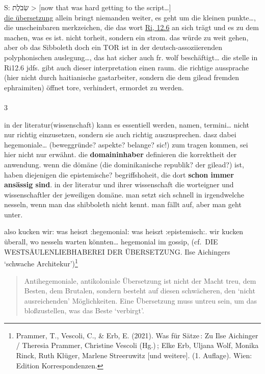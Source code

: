 \documentclass[
  letterpaper,
  DIV=11,
  numbers=noendperiod]{scrartcl}
\makeatletter
\let\oldparagraph\paragraph
\renewcommand{\paragraph}{
    \@ifstar
      \xxxParagraphStar
      \xxxParagraphNoStar
  }
\newcommand{\xxxParagraphStar}[1]{\oldparagraph*{#1}\mbox{}}
\newcommand{\xxxParagraphNoStar}[1]{\oldparagraph{#1}\mbox{}}
\makeatother
\begin{document}
S: שִׂבֹלֶת \textgreater{} {[}now that was hard getting to the
script\ldots{]}\\
\href{https://www.pealim.com/dict/3270-shibolet/}{die übersetzung}
allein bringt niemanden weiter, es geht um die kleinen punkte\ldots, die
unscheinbaren merkzeichen, die das wort
\href{https://www.sefaria.org/Judges.12.6?lang=bi&with=all&lang2=en}{Ri,
12.6} an sich trägt und es zu dem machen, was es ist. nicht torheit,
sondern ein strom. das würde zu weit gehen, aber ob das Sibboleth doch
ein TOR ist in der deutsch-assoziierenden polyphonischen
auslegung\ldots, das hat sicher auch fr. wolf beschäftigt\ldots{} die
stelle in Ri12.6 jdfs. gibt auch dieser interpretation einen raum. die
richtige aussprache (hier nicht durch haitianische gastarbeiter, sondern
die dem gilead fremden ephraimiten) öffnet tore, verhindert, ermordet zu
werden.

\paragraph{3}\label{section-2}

in der literatur(wissenschaft) kann es essentiell werden, namen,
termini\ldots{} nicht nur richtig einzusetzen, sondern sie auch richtig
auszusprechen. dasz dabei hegemoniale\ldots{} (beweggründe? aspekte?
belange? sic!) zum tragen kommen, sei hier nicht nur erwähnt. die
\textbf{domaininhaber} definieren die korrektheit der anwendung. wenn
die dömäne (die dominikanische republik? der gilead?) ist, haben
diejenigen die epistemische? begriffshoheit, die dort \textbf{schon
immer ansässig sind}. in der literatur und ihrer wissenschaft die
worteigner und wissenschaftler der jeweiligen domäne. man setzt sich
schnell in irgendwelche nesseln, wenn man das shibboleth nicht kennt.
man fällt auf, aber man geht unter.

also kucken wir: was heiszt :hegemonial: was heiszt :epistemisch:. wir
kucken überall, wo nesseln warten könnten\ldots{} hegemonial im gossip,
(cf.~DIE WESTSÄULENLIEBHABEREI DER ÜBERSETZUNG. Ilse Aichingers
`schwache Architekur')\footnote{Prammer, T., Vescoli, C., \& Erb, E.
  (2021). Was für Sätze\,: Zu Ilse Aichinger / Theresia Prammer,
  Christine Vescoli (Hg.)\,; Elke Erb, Uljana Wolf, Monika Rinck, Ruth
  Klüger, Marlene Streeruwitz {[}und weitere{]}. (1. Auflage). Wien:
  Edition Korrespondenzen.}

\begin{quote}
Antihegemoniale, antikoloniale Übersetzung ist nicht der Macht treu, dem
Besten, dem Brutalen, sondern besteht auf diesen schwächeren, den `nicht
ausreichenden' Möglichkeiten. Eine Übersetzung muss untreu sein, um das
bloßzustellen, was das Beste `verbirgt'.
\end{quote}
\end{document}
